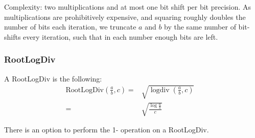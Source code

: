 \documentclass{article}
\DeclareMathOperator{\logdiv}{logdiv}
\begin{document}
\begin{itemize}
                        Complexity: two multiplications and at most one bit shift per bit precision.
                        As multiplications are prohibitively expensive, and squaring roughly doubles the number of bits each iteration, we truncate $a$ and $b$ by the same number of bit-shifts every iteration, such that in each number enough bits are left.
                    \end{itemize}

        \subsubsection{RootLogDiv}
            A RootLogDiv is the following:
            \begin{align*}
                \text{RootLogDiv}(\frac{a}{b},c) ={}& \sqrt{\logdiv(\frac{a}{b}, c)}\\
                {}={}& \sqrt{\frac{\log\frac{a}{b}}{c}}& 
            \end{align*}

            There is an option to perform the 1- operation on a RootLogDiv.
            
    
    

    \printindex
\end{document}
